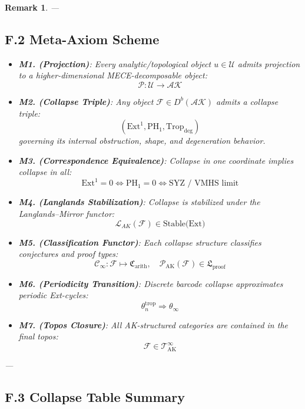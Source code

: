 \documentclass[11pt]{article}
\newtheorem{remark}[theorem]{Remark}
\begin{document}
\begin{remark}
---

\subsection*{F.2 Meta-Axiom Scheme}

\begin{itemize}
  \item \textbf{M1. (Projection)}:  
  Every analytic/topological object \( u \in \mathcal{U} \) admits projection to a higher-dimensional MECE-decomposable object:
  \[
  \mathcal{P}: \mathcal{U} \to \mathcal{AK}
  \]

  \item \textbf{M2. (Collapse Triple)}:  
  Any object \( \mathcal{F} \in D^b(\mathcal{AK}) \) admits a collapse triple:
  \[
  (\mathrm{Ext}^1, \mathrm{PH}_1, \mathrm{Trop}_{\mathrm{deg}})
  \]
  governing its internal obstruction, shape, and degeneration behavior.

  \item \textbf{M3. (Correspondence Equivalence)}:  
  Collapse in one coordinate implies collapse in all:
  \[
  \mathrm{Ext}^1 = 0 \Leftrightarrow \mathrm{PH}_1 = 0 \Leftrightarrow \text{SYZ / VMHS limit}
  \]

  \item \textbf{M4. (Langlands Stabilization)}:  
  Collapse is stabilized under the Langlands–Mirror functor:
  \[
  \mathcal{L}_{AK}(\mathcal{F}) \in \text{Stable(Ext)}
  \]

  \item \textbf{M5. (Classification Functor)}:  
  Each collapse structure classifies conjectures and proof types:
  \[
  \mathscr{C}_\infty: \mathcal{F} \mapsto \mathfrak{C}_{\mathrm{arith}}, \quad
  \mathscr{P}_{\mathrm{AK}}(\mathcal{F}) \in \mathfrak{L}_{\mathrm{proof}}
  \]

  \item \textbf{M6. (Periodicity Transition)}:  
  Discrete barcode collapse approximates periodic Ext-cycles:
  \[
  \theta^\mathrm{trop}_n \Rightarrow \theta_\infty
  \]

  \item \textbf{M7. (Topos Closure)}:  
  All AK-structured categories are contained in the final topos:
  \[
  \mathcal{F} \in \mathscr{T}_{\mathrm{AK}}^\infty
  \]
\end{itemize}

---

\subsection*{F.3 Collapse Table Summary}


\end{remark}
\end{document}

